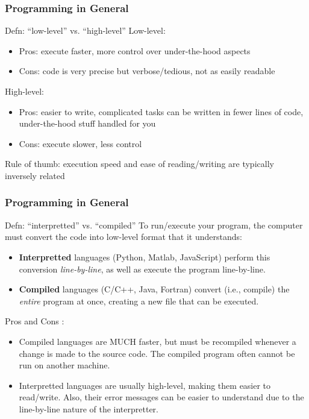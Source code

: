 \documentclass{beamer}
\begin{document}
\begin{frame}	
	\frametitle{Programming in General}
	
	\begin{block}{Defn: ``low-level'' vs. ``high-level''}
		Low-level:
		\begin{itemize}
			\item Pros: execute faster, more control over under-the-hood aspects
			\item Cons: code is very precise but verbose/tedious, not as easily readable
		\end{itemize}
		
		\vspace{10pt}
		
		High-level:
		\begin{itemize}
			\item Pros: easier to write, complicated tasks can be written in fewer lines of code, under-the-hood stuff handled for you
			\item Cons: execute slower, less control
		\end{itemize}
		
		\vspace{10pt}
		
		Rule of thumb: execution speed and ease of reading/writing are typically inversely related
		
	\end{block}
	
\end{frame}

\begin{frame}	
	\frametitle{Programming in General}
	
	\begin{alertblock}{Defn: ``interpretted'' vs. ``compiled''}
		To run/execute your program, the computer must convert the code into low-level format that it understands:
		\begin{itemize}
			\item 	\textbf{Interpretted} languages (Python, Matlab, JavaScript) perform this conversion \textit{line-by-line}, as well as execute the program line-by-line.
			\item \textbf{Compiled} languages (C/C++, Java, Fortran) convert (i.e., compile) the \textit{entire} program at once, creating a new file that can be executed.
		\end{itemize}
		
		\vspace{10pt}

		Pros and Cons		:
		\begin{itemize}
			\item Compiled languages are MUCH faster, but must be recompiled whenever a change is made to the source code. The compiled program often cannot be run on another machine.
			\item Interpretted languages are usually high-level, making them easier to read/write. Also, their error messages can be easier to understand due to the line-by-line nature of the interpretter.
		\end{itemize}
		
	\end{alertblock}
	
\end{frame}
\end{document}
